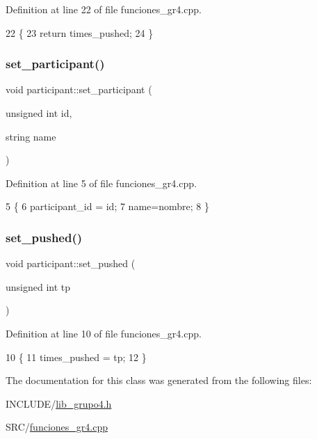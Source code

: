 Definition at line 22 of file funciones\+\_\+gr4.\+cpp.


\begin{DoxyCode}
22                                       \{
23     \textcolor{keywordflow}{return} times\_pushed;
24 \}
\end{DoxyCode}
\mbox{\label{classparticipant_ac6d9797d61b16b3ccc2edf65ed73ff65}} 
\subsubsection{\texorpdfstring{set\+\_\+participant()}{set\_participant()}}
{\footnotesize\ttfamily void participant\+::set\+\_\+participant (\begin{DoxyParamCaption}\item[{unsigned int}]{id,  }\item[{string}]{name }\end{DoxyParamCaption})}



Definition at line 5 of file funciones\+\_\+gr4.\+cpp.


\begin{DoxyCode}
5                                                                  \{
6     participant\_id = id;
7     name=nombre;
8 \}
\end{DoxyCode}
\mbox{\label{classparticipant_a8633b78a8492889f04cf05d3b892939f}} 
\subsubsection{\texorpdfstring{set\+\_\+pushed()}{set\_pushed()}}
{\footnotesize\ttfamily void participant\+::set\+\_\+pushed (\begin{DoxyParamCaption}\item[{unsigned int}]{tp }\end{DoxyParamCaption})}



Definition at line 10 of file funciones\+\_\+gr4.\+cpp.


\begin{DoxyCode}
10                                               \{
11     times\_pushed = tp;
12 \}
\end{DoxyCode}


The documentation for this class was generated from the following files\+:\begin{DoxyCompactItemize}
\item 
I\+N\+C\+L\+U\+D\+E/\hyperlink{lib__grupo4_8h}{lib\+\_\+grupo4.\+h}\item 
S\+R\+C/\hyperlink{funciones__gr4_8cpp}{funciones\+\_\+gr4.\+cpp}\end{DoxyCompactItemize}
